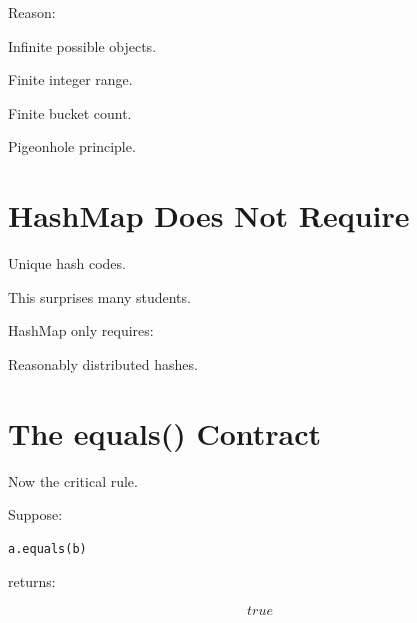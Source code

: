 \documentclass[11pt,a4paper]{book}
\begin{document}

Reason:


Infinite possible objects.


Finite integer range.


Finite bucket count.


Pigeonhole principle.


\section{HashMap Does Not Require}


Unique hash codes.


This surprises many students.


HashMap only requires:


Reasonably distributed hashes.


\section{The equals() Contract}

Now the critical rule.


Suppose:

\begin{verbatim} 
a.equals(b)
\end{verbatim}

returns:

\[
true
\]
\end{document}

